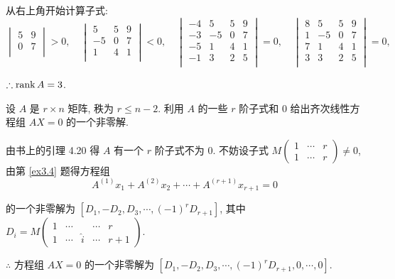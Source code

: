 \documentclass[color=black,device=normal,lang=cn,mode=geye]{elegantnote}
\begin{document}
\begin{solution}
    从右上角开始计算子式:
    \[\begin{vmatrix}
        5 & 9 \\
        0 & 7 \\
    \end{vmatrix}>0,\quad\begin{vmatrix}
        5 & 5 & 9 \\
        -5 & 0 & 7 \\
        1 & 4 & 1 \\
    \end{vmatrix}<0,\quad\begin{vmatrix}
        -4 & 5 & 5 & 9 \\
        -3 & -5 & 0 & 7 \\
        -5 & 1 & 4 & 1 \\
        -1 & 3 & 2 & 5 \\
    \end{vmatrix}=0,\quad\begin{vmatrix}
        8 & 5 & 5 & 9 \\
        1 & -5 & 0 & 7 \\
        7 & 1 & 4 & 1 \\
        3 & 3 & 2 & 5 \\
    \end{vmatrix}=0,\]

    $\therefore\operatorname{rank} A=3$.
\end{solution}
\begin{exercisec}[4.3.5]
    设 $A$ 是 $r\times n$ 矩阵, 秩为 $r\leq n-2$. 利用 $A$ 的一些 $r$ 阶子式和 $0$ 给出齐次线性方程组 $AX=0$ 的一个非零解.
\end{exercisec}
\begin{solution}
    由书上的引理 4.20 得 $A$ 有一个 $r$ 阶子式不为 $0$. 不妨设子式 $M\begin{pmatrix} 1 & \cdots & r \\ 1 & \cdots & r \end{pmatrix}\neq0$, 由第 \ref{ex3.4} 题得方程组
    \[A^{(1)}x_1+A^{(2)}x_2+\cdots+A^{(r+1)}x_{r+1}=0\]

    的一个非零解为 $[D_1,-D_2,D_3,\cdots,(-1)^rD_{r+1}]$, 其中 $D_i=M\begin{pmatrix} 1 & \cdots && \cdots & r \\ 1 & \cdots & \hat{i} & \cdots & r+1 \end{pmatrix}$.
    
    $\therefore$ 方程组 $AX=0$ 的一个非零解为 $[D_1,-D_2,D_3,\cdots,(-1)^rD_{r+1},0,\cdots,0]$.
\end{solution}
\end{document}

